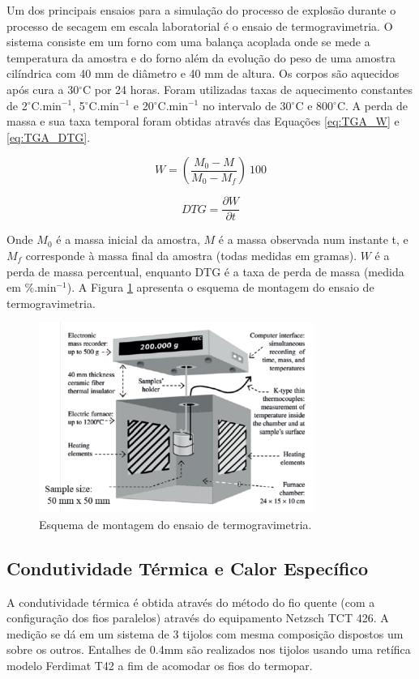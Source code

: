 Um dos principais ensaios para a simulação do processo de explosão durante o
processo de secagem em escala laboratorial é o ensaio de termogravimetria. O
sistema consiste em um forno com uma balança acoplada onde se mede a temperatura
da amostra e do forno além da evolução do peso de uma amostra cilíndrica com 40
mm de diâmetro e 40 mm de altura. Os corpos são aquecidos após cura a
30$^\circ$C por 24 horas. Foram utilizadas taxas de aquecimento constantes de
2$^\circ$C.min$^{-1}$, 5$^\circ$C.min$^{-1}$ e 20$^\circ$C.min$^{-1}$ no
intervalo de 30$^\circ$C e 800$^\circ$C. A perda de massa e sua taxa temporal
foram obtidas através das Equações \ref{eq:TGA_W} e \ref{eq:TGA_DTG}.

\begin{equation}
  \label{eq:TGA_W}
  W = \left( \frac{M_0-M}{M_0-M_f} \right) \ 100
\end{equation}

\begin{equation}
  \label{eq:TGA_DTG}
  DTG = \frac{\partial W}{\partial t}
\end{equation}

Onde $M_0$ é a massa inicial da amostra, $M$ é a massa observada num instante t,
e $M_f$ corresponde à massa final da amostra (todas medidas em gramas). $W$ é a
perda de massa percentual, enquanto DTG é a taxa de perda de massa (medida em
\%.min$^{-1}$). A Figura \ref{fig:TGA} apresenta o esquema de montagem do ensaio
de termogravimetria.
    
\begin{figure}[ht]
	\centering
	\includegraphics[width=9cm]{./figures/TGA.pdf}
	\caption{Esquema de montagem do ensaio de termogravimetria. \label{fig:TGA}}
\end{figure}



\subsection{Condutividade Térmica e Calor Específico}\label{mat:condutividade}
A condutividade térmica é obtida através do método do fio quente (com a
configuração dos fios paralelos) através do equipamento Netzsch TCT 426. A
medição se dá em um sistema de 3 tijolos com mesma composição dispostos um sobre
os outros. Entalhes de 0.4mm são realizados nos tijolos usando uma retífica
modelo Ferdimat T42 a fim de acomodar os fios do termopar.

